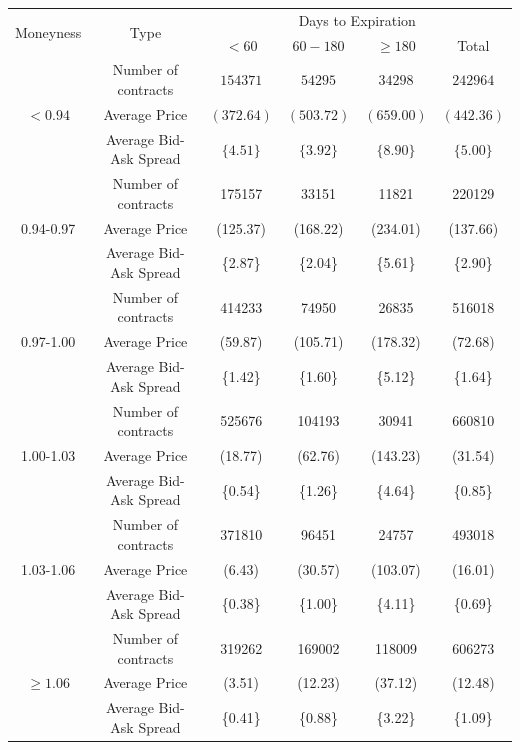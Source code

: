 \documentclass{article}
\begin{document}
\begin{table}[htp]
    \centering
    \begin{tabular}{cc|cccc}
        \hline
        \multirow{2}{*}{Moneyness} & \multirow{2}{*}{Type} &
            \multicolumn{4}{c}{Days to Expiration} \\
        & & $< 60$ & $60 - 180$ & $\geq 180$ & Total \\
        \hline
        \multirow{3}{*}{$< 0.94$} & Number of contracts & $154371$ & $54295$ & $34298$ & $242964$ \\
        & Average Price & $(372.64)$ & $(503.72)$ & $(659.00)$ & $(442.36)$ \\
        & Average Bid-Ask Spread & $\{4.51\}$ & $\{3.92\}$ & $\{8.90\}$ & $\{5.00\}$ \\
        \hline
        \multirow{3}{*}{0.94-0.97} & Number of contracts & 175157 & 33151 & 11821 & 220129 \\
        & Average Price & (125.37) & (168.22) & (234.01) & (137.66) \\
        & Average Bid-Ask Spread & \{2.87\} & \{2.04\} & \{5.61\} & \{2.90\} \\
        \hline
        \multirow{3}{*}{0.97-1.00} & Number of contracts & 414233 & 74950 & 26835 & 516018 \\
        & Average Price & (59.87) & (105.71) & (178.32) & (72.68) \\
        & Average Bid-Ask Spread & \{1.42\} & \{1.60\} & \{5.12\} & \{1.64\} \\
        \hline
        \multirow{3}{*}{1.00-1.03} & Number of contracts & 525676 & 104193 & 30941 & 660810 \\
        & Average Price & (18.77) & (62.76) & (143.23) & (31.54) \\
        & Average Bid-Ask Spread & \{0.54\} & \{1.26\} & \{4.64\} & \{0.85\} \\
        \hline
        \multirow{3}{*}{1.03-1.06} & Number of contracts & 371810 & 96451 & 24757 & 493018 \\
        & Average Price & (6.43) & (30.57) & (103.07) & (16.01) \\
        & Average Bid-Ask Spread & \{0.38\} & \{1.00\} & \{4.11\} & \{0.69\} \\
        \hline
        \multirow{3}{*}{$\geq 1.06$} & Number of contracts & 319262 & 169002 & 118009 & 606273 \\
        & Average Price & (3.51) & (12.23) & (37.12) & (12.48) \\
        & Average Bid-Ask Spread & \{0.41\} & \{0.88\} & \{3.22\} & \{1.09\} \\

\end{tabular}
\end{table}
\end{document}
